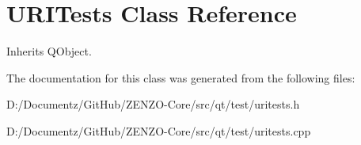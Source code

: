 \hypertarget{class_u_r_i_tests}{}\section{U\+R\+I\+Tests Class Reference}
\label{class_u_r_i_tests}


Inherits Q\+Object.



The documentation for this class was generated from the following files\+:\begin{DoxyCompactItemize}
\item 
D\+:/\+Documentz/\+Git\+Hub/\+Z\+E\+N\+Z\+O-\/\+Core/src/qt/test/uritests.\+h\item 
D\+:/\+Documentz/\+Git\+Hub/\+Z\+E\+N\+Z\+O-\/\+Core/src/qt/test/uritests.\+cpp\end{DoxyCompactItemize}
